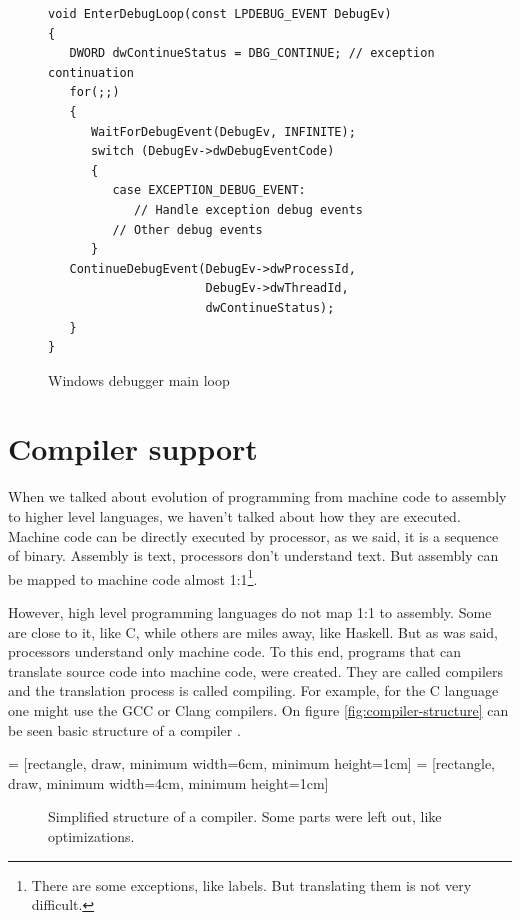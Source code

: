 \begin{figure}
    \begin{verbatim}
void EnterDebugLoop(const LPDEBUG_EVENT DebugEv)
{
   DWORD dwContinueStatus = DBG_CONTINUE; // exception continuation
   for(;;)
   {
      WaitForDebugEvent(DebugEv, INFINITE);
      switch (DebugEv->dwDebugEventCode)
      {
         case EXCEPTION_DEBUG_EVENT:
            // Handle exception debug events
         // Other debug events
      }
   ContinueDebugEvent(DebugEv->dwProcessId,
                      DebugEv->dwThreadId,
                      dwContinueStatus);
   }
}
\end{verbatim}
\caption{Windows debugger main loop}
\label{fig:windows-debugger-mainloop}
\end{figure}

\section{Compiler support}
When we talked about evolution of programming from machine code to assembly to
higher level languages, we haven't talked about how they are executed. Machine
code can be directly executed by processor, as we said, it is a sequence of
binary. Assembly is text, processors don't understand text. But assembly can be
mapped to machine code almost 1:1\footnote{There are some exceptions, like
labels. But translating them is not very difficult.}.

However, high level programming languages do not map 1:1 to assembly. Some are
close to it, like C, while others are miles away, like Haskell. But as was
said, processors understand only machine code. To this end, programs that can
translate source code into machine code, were created. They are called
compilers and the translation process is called compiling. For example, for the
C language one might use the GCC or Clang compilers. On figure
\ref{fig:compiler-structure} can be seen basic structure of a compiler
\cite{dragon-book}. 

 = [rectangle, draw, minimum width=6cm, minimum height=1cm] 
 = [rectangle, draw, minimum width=4cm, minimum height=1cm] 
\begin{figure}\label{fig:compiler-structure}
    {\centering
    \par}
    \caption{Simplified structure of a compiler. Some parts were left out, like optimizations.}
    \label{fig:compiler_tikz}
\end{figure}

